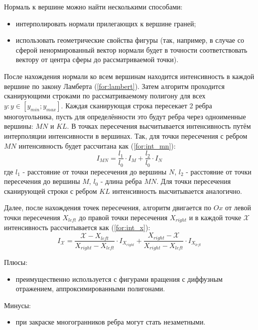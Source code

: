 Нормаль к вершине можно найти несколькими способами:
\begin{itemize}
    \item интерполировать нормали прилегающих к вершине граней;
    \item использовать геометрические свойства фигуры (так, например, в случае
        со сферой ненормированный вектор нормали будет в точности
        соответствовать вектору от центра сферы до рассматриваемой точки).
\end{itemize}

После нахождения нормали ко всем вершинам находится интенсивность в каждой
вершине по закону Ламберта (\ref{for:lambert}).  Затем алгоритм проходится
сканирующими строками по рассматриваемому полигону для всех $y: y \in [y_{min};
y_{max}]$. Каждая сканирующая строка пересекает 2 ребра многоугольника, пусть
для определённости это будут ребра через одноименные вершины: $MN$ и $KL$. В
точках пересечения высчитывается интенсивность путём интерполяции интенсивности
в вершинах. Так, для точки пересечения с ребром $MN$ интенсивность будет
рассчитана как (\ref{for:int_mn}):
\begin{equation}
    \label{for:int_mn}
    I_{MN} = \frac{l_1}{l_0} \cdot I_M + \frac{l_2}{l_0} \cdot I_N
\end{equation}
где $l_1$ - расстояние от точки пересечения до вершины $N$, $l_2$ - расстояние
от точки пересечения до вершины $M$, $l_0$ - длина ребра $MN$.  Для точки
пересечения сканирующей строки с ребром $KL$ интенсивность высчитывается
аналогично.

Далее, после нахождения точек пересечения, алгоритм двигается по $Ox$ от левой
точки пересечения $X_{left}$ до правой точки пересечения $X_{right}$ и в каждой
точке $\mathcal{X}$ интенсивность рассчитывается как (\ref{for:int_x}):
\begin{equation}
    \label{for:int_x}
    I_{\mathcal{X}} = \frac{\mathcal{X} - X_{left}}{X_{right} - X_{left}} \cdot
    I_{X_{right}} + \frac{X_{right} - \mathcal{X}}{X_{right} - X_{left}} \cdot
    I_{X_{left}}
\end{equation}

Плюсы:
\begin{itemize}
    \item преимущественно используется с фигурами вращения с диффузным
        отражением, аппроксимированными полигонами.
\end{itemize}

Минусы:
\begin{itemize}
    \item при закраске многогранников ребра могут стать незаметными.
\end{itemize}

